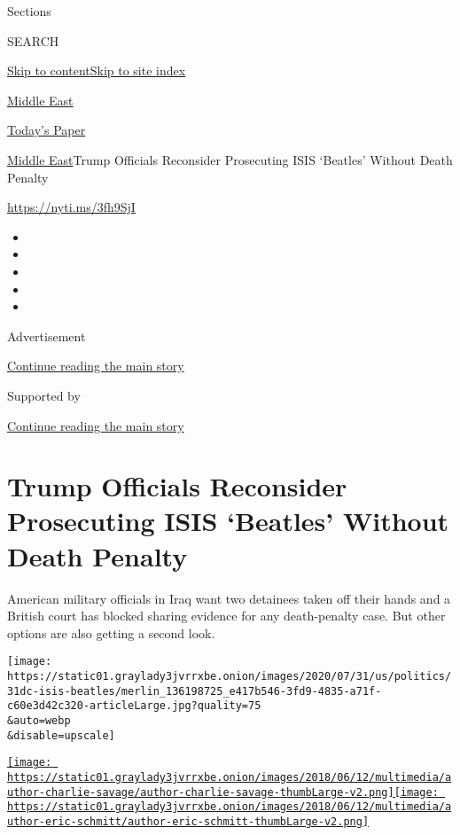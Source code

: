 Sections

SEARCH

\protect\hyperlink{site-content}{Skip to
content}\protect\hyperlink{site-index}{Skip to site index}

\href{https://www.nytimes3xbfgragh.onion/section/world/middleeast}{Middle
East}

\href{https://myaccount.nytimes3xbfgragh.onion/auth/login?response_type=cookie\&client_id=vi}{}

\href{https://www.nytimes3xbfgragh.onion/section/todayspaper}{Today's
Paper}

\href{/section/world/middleeast}{Middle East}\textbar{}Trump Officials
Reconsider Prosecuting ISIS `Beatles' Without Death Penalty

\url{https://nyti.ms/3fh9SjI}

\begin{itemize}
\item
\item
\item
\item
\item
\end{itemize}

Advertisement

\protect\hyperlink{after-top}{Continue reading the main story}

Supported by

\protect\hyperlink{after-sponsor}{Continue reading the main story}

\hypertarget{trump-officials-reconsider-prosecuting-isis-beatles-without-death-penalty}{%
\section{Trump Officials Reconsider Prosecuting ISIS `Beatles' Without
Death
Penalty}\label{trump-officials-reconsider-prosecuting-isis-beatles-without-death-penalty}}

American military officials in Iraq want two detainees taken off their
hands and a British court has blocked sharing evidence for any
death-penalty case. But other options are also getting a second look.

\texttt{[image: https://static01.graylady3jvrrxbe.onion/images/2020/07/31/us/politics/31dc-isis-beatles/merlin\_136198725\_e417b546-3fd9-4835-a71f-c60e3d42c320-articleLarge.jpg?quality=75\\\&auto=webp\\\&disable=upscale]}

\href{https://www.nytimes3xbfgragh.onion/by/charlie-savage}{\texttt{[image: https://static01.graylady3jvrrxbe.onion/images/2018/06/12/multimedia/author-charlie-savage/author-charlie-savage-thumbLarge-v2.png]}}\href{https://www.nytimes3xbfgragh.onion/by/eric-schmitt}{\texttt{[image: https://static01.graylady3jvrrxbe.onion/images/2018/06/12/multimedia/author-eric-schmitt/author-eric-schmitt-thumbLarge-v2.png]}}

